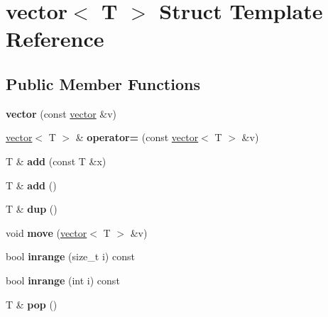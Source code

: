 \hypertarget{structvector}{}\section{vector$<$ T $>$ Struct Template Reference}
\label{structvector}
\subsection*{Public Member Functions}
\begin{DoxyCompactItemize}
\item 
\mbox{\label{structvector_ac636edc485bffa973b50b8bdfb1cc9cb}} 
{\bfseries vector} (const \hyperlink{structvector}{vector} \&v)
\item 
\mbox{\label{structvector_a7715d43cace69c42ecfa79f8416933a4}} 
\hyperlink{structvector}{vector}$<$ T $>$ \& {\bfseries operator=} (const \hyperlink{structvector}{vector}$<$ T $>$ \&v)
\item 
\mbox{\label{structvector_a6b49c3419e911a3696ac7accd93797e0}} 
T \& {\bfseries add} (const T \&x)
\item 
\mbox{\label{structvector_afaecf88fd5905d67d85cefe027ab5f89}} 
T \& {\bfseries add} ()
\item 
\mbox{\label{structvector_a125e3f903da9fa0889645e2b89ce4ebe}} 
T \& {\bfseries dup} ()
\item 
\mbox{\label{structvector_ad4c9f84ea231d91dbe2507aa3aef82ec}} 
void {\bfseries move} (\hyperlink{structvector}{vector}$<$ T $>$ \&v)
\item 
\mbox{\label{structvector_a9c8b60b827cee171c65238526b27a623}} 
bool {\bfseries inrange} (size\+\_\+t i) const
\item 
\mbox{\label{structvector_a4fc5cf788f4ff40e5c9c31f7ac10b5ce}} 
bool {\bfseries inrange} (int i) const
\item 
\mbox{\label{structvector_ae802c19b7cd3079d98559452d1f0b71e}} 
T \& {\bfseries pop} ()
\item 
\mbox{\label{structvector_a0fcb724cfa21f1774d20cd40adbe80f3}} 

\end{DoxyCompactItemize}
